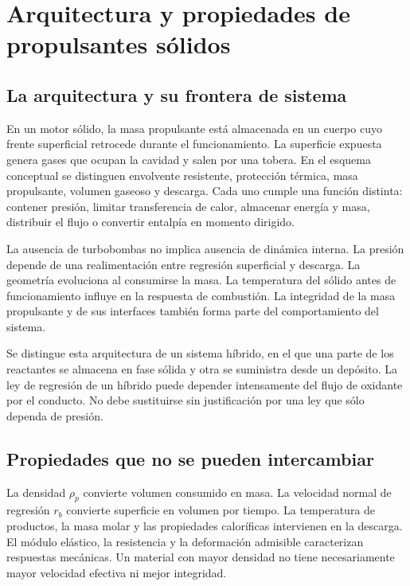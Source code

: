 \chapter{Arquitectura y propiedades de propulsantes sólidos}\label{ch:10}
\section{La arquitectura y su frontera de sistema}
En un motor sólido, la masa propulsante está almacenada en un cuerpo cuyo frente superficial retrocede durante el funcionamiento. La superficie expuesta genera gases que ocupan la cavidad y salen por una tobera. En el esquema conceptual se distinguen envolvente resistente, protección térmica, masa propulsante, volumen gaseoso y descarga. Cada uno cumple una función distinta: contener presión, limitar transferencia de calor, almacenar energía y masa, distribuir el flujo o convertir entalpía en momento dirigido.

La ausencia de turbobombas no implica ausencia de dinámica interna. La presión depende de una realimentación entre regresión superficial y descarga. La geometría evoluciona al consumirse la masa. La temperatura del sólido antes de funcionamiento influye en la respuesta de combustión. La integridad de la masa propulsante y de sus interfaces también forma parte del comportamiento del sistema.

Se distingue esta arquitectura de un sistema híbrido, en el que una parte de los reactantes se almacena en fase sólida y otra se suministra desde un depósito. La ley de regresión de un híbrido puede depender intensamente del flujo de oxidante por el conducto. No debe sustituirse sin justificación por una ley que sólo dependa de presión.
\section{Propiedades que no se pueden intercambiar}
La densidad $\rho_p$ convierte volumen consumido en masa. La velocidad normal de regresión $r_b$ convierte superficie en volumen por tiempo. La temperatura de productos, la masa molar y las propiedades caloríficas intervienen en la descarga. El módulo elástico, la resistencia y la deformación admisible caracterizan respuestas mecánicas. Un material con mayor densidad no tiene necesariamente mayor velocidad efectiva ni mejor integridad.

